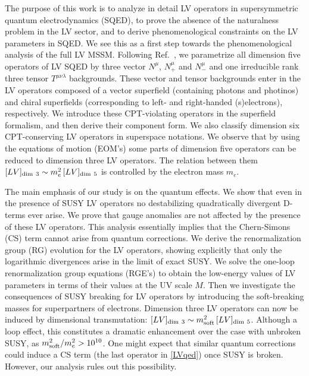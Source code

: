 \documentclass[12pt]{revtex4}
\begin{document}
The purpose of this work is to analyze in detail LV operators in 
supersymmetric quantum electrodynamics (SQED), to prove 
the absence of the naturalness problem in the LV sector, and to derive
phenomenological  constraints on the LV parameters in SQED.  
We see this as a first step towards the phenomenological analysis of the full
LV MSSM.  Following Ref.~\cite{GrootNibbelink:2004za}, we
parametrize all dimension five operators of LV SQED by three vector 
$N^{\mu}$, $N^{\mu}_+$ and $N^{\mu}_-$ and one irreducible 
rank three tensor $T^{\mu\nu\lambda}$ backgrounds. 
These vector and tensor backgrounds enter in the LV
operators composed  of a vector superfield (containing photons and
photinos) and chiral superfields (corresponding to left- and
right-handed (s)electrons), respectively. 
We introduce these CPT-violating operators in the superfield
formalism, and then derive their component form. We also classify
dimension six CPT-conserving LV operators in superspace notations. 
We observe that by using the equations of
motion (EOM's) some parts of dimension five operators can be 
reduced to dimension three LV operators. The relation  
between them
$[LV]_{\rm dim~3} \sim m_e^2\, [LV]_{\rm dim~5}$ 
is controlled by the electron mass $m_e$. 


The main emphasis of our study is on the quantum effects. We show that
even in the presence of SUSY LV operators no destabilizing quadratically
divergent D-terms ever arise. We prove that gauge anomalies are
not affected by the presence of these LV operators. This analysis
essentially implies that the Chern-Simons (CS) term cannot arise from quantum
corrections. We derive the renormalization group (RG) evolution for the
LV operators, showing explicitly that only the logarithmic divergences
arise in the limit of exact SUSY. We solve the one-loop
renormalization group equations (RGE's)  to obtain the low-energy
values of LV parameters in terms of their values at the UV scale
$M$. Then we investigate the consequences of SUSY breaking for
LV operators by introducing the soft-breaking masses for superpartners
of electrons. Dimension three LV operators can now be induced by
dimensional transmutation: 
$[LV]_{\rm dim~3} \sim m_{\rm soft}^2 \, [LV]_{\rm dim~5}$. 
Although a loop effect, this constitutes a dramatic enhancement over
the case with unbroken SUSY, as $ m_{\rm soft}^2/m_e^2 > 10^{10}$.  
One might expect that similar quantum corrections could induce a CS
term (the last operator in \eqref{LVqed}) once SUSY is
broken. However, our analysis rules out this possibility. 
\end{document}
